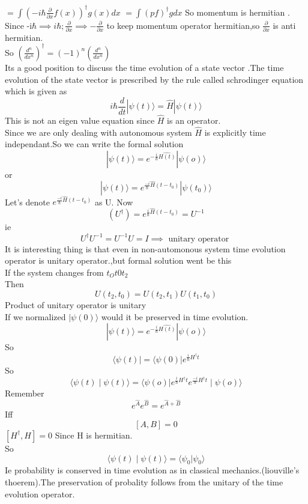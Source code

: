 $=\int\left( -i\hbar \frac{\partial}{\partial x}f(x)\right) ^{\dagger}g(x)dx$
$=\int(pf)^{\dagger}g dx$
So momentum is hermitian .\\
Since -i$\hbar\implies i\hbar;\frac{\partial}{\partial x} \implies -\frac{\partial}{\partial x}$ to keep momentum operator hermitian,so $ \frac{\partial}{\partial x}$ is anti hermitian.\\
So $\left( \frac{d^n}{dx^n}\right) ^{\dagger}=(-1)^n \left( \frac{d^n}{dx^n}\right)$\\
Its a good position to discuss the time evolution of a state vector .The time evolution of the state vector is prescribed by the rule called schrodinger equation which is given as \\
$$i\hbar \frac{d}{dt}|\psi(t)\rangle =\hat{H}|\psi(t)\rangle $$
This is not an eigen value equation since $\hat{H}$ is an operator.\\
Since we are only dealing with autonomous system $\hat{H}$ is explicitly time independant.So we can write the formal solution \\
$$|\psi(t) \rangle =e^{-\frac{i}{\hbar}\hat{H(t)}} |\psi(o)\rangle $$
or $$|\psi(t) \rangle =e^{\frac{-i}{\hbar}\hat{H}(t-t_0)} |\psi(t_0)\rangle$$
Let's denote $e^{\frac{-i}{\hbar}\hat{H}(t-t_0)}$ as U.
Now $$(U^{\dagger})=e^{\frac{i}{\hbar}\hat{H}(t-t_0)}=U^{-1}$$
ie $$U^{\dagger}U^{-1}=U^{-1}U=I\implies \text{ unitary operator }$$
It is interesting thing is that even in non-automonous system time evolution operator is unitary operator.,but formal solution went be this \\
If the system changes from $t_O t0 t_2$\\
Then $$U(t_2,t_0)=U(t_2,t_1)U(t_1,t_0)$$
Product of unitary operator is unitary \\
If we normalized $|\psi(0)\rangle$ would it be preserved in time evolution.\\
$$|\psi(t) \rangle =e^{-\frac{i}{\hbar}\hat{H(t)}} |\psi(o)\rangle $$
So $$\langle \psi(t)|=\langle \psi(0)|e^{\frac{i}{\hbar}
H^{\dagger}t}$$
So $$\langle \psi(t)\mid \psi(t)\rangle=\langle \psi(o)|e^{\frac{i}{\hbar}H^{\dagger}t}e^{\frac{-i}{\hbar}H^{\dagger}t}\mid \psi(o)\rangle$$ 
Remember $$e^{\hat{A}}e^{\hat{B}}=e^{\hat{A}+\hat{B}}$$
 Iff $$\left[ A,B\right] =0$$
$ \left[ H^{\dagger},H\right] =0$ Since H is hermitian.\\
So $$\langle \psi(t)\mid \psi(t)\rangle=\langle \psi_{0}|\psi_{0}\rangle$$
Ie probability is conserved in time evolution as in classical mechanics.(liouville's thoerem).The preservation of probality follows from the unitary of the time evolution operator.\\
